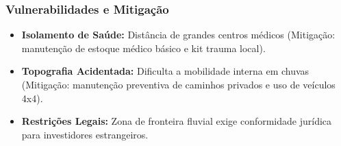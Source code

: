 \subsubsection{Vulnerabilidades e
Mitigação}

\begin{itemize}
\tightlist
\item
  \textbf{Isolamento de Saúde:} Distância de grandes centros médicos
  (Mitigação: manutenção de estoque médico básico e kit trauma local).
\item
  \textbf{Topografia Acidentada:} Dificulta a mobilidade interna em
  chuvas (Mitigação: manutenção preventiva de caminhos privados e uso de
  veículos 4x4).
\item
  \textbf{Restrições Legais:} Zona de fronteira fluvial exige
  conformidade jurídica para investidores estrangeiros.
\end{itemize}

